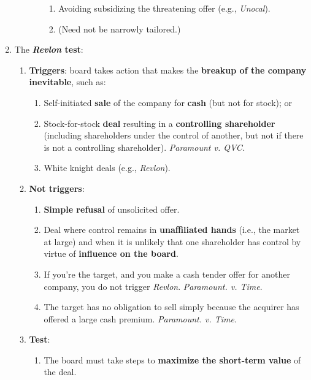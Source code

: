 \begin{enumerate}
\begin{enumerate}
\begin{enumerate}
\begin{enumerate}
                \item Avoiding subsidizing the threatening offer (e.g., 
                \emph{Unocal}).
                \item (Need not be narrowly tailored.)
            \end{enumerate}
        \end{enumerate}
    \end{enumerate}
    \item The \textbf{\emph{Revlon} test}:
    \begin{enumerate}
        \item \textbf{Triggers}: board takes action that makes the 
        \textbf{breakup of the company inevitable}, such as:
        \begin{enumerate}
            \item Self-initiated \textbf{sale} of the company for 
            \textbf{cash} (but not for stock); or
            \item Stock-for-stock \textbf{deal} resulting in a 
            \textbf{controlling shareholder} (including shareholders under the 
            control of another, but not if there is not a controlling 
            shareholder). \emph{Paramount v. QVC.}
            \item White knight deals (e.g., \emph{Revlon}).
        \end{enumerate}
        \item \textbf{Not triggers}:
        \begin{enumerate}
            \item \textbf{Simple refusal} of unsolicited offer.
            \item Deal where control remains in \textbf{unaffiliated hands} 
            (i.e., the market at large) and when it is unlikely that one 
            shareholder has control by virtue of \textbf{influence on the 
            board}.
            \item If you're the target, and you make a cash tender offer for 
            another company, you do not trigger \emph{Revlon}. 
            \emph{Paramount. v. Time}.
            \item The target has no obligation to sell simply because the 
            acquirer has offered a large cash premium. \emph{Paramount. v. Time}.
        \end{enumerate}
        \item \textbf{Test}:
        \begin{enumerate}
            \item The board must take steps to \textbf{maximize the short-term 
            value} of the deal.
        \end{enumerate}
    \end{enumerate}
\end{enumerate}

